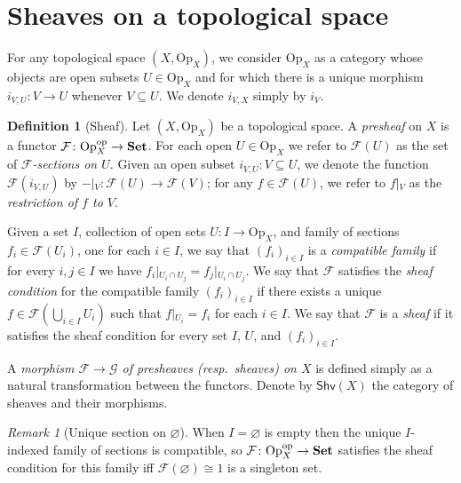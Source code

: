 \documentclass[11pt, oneside, article]{memoir}
\theoremstyle{plain}
\theoremstyle{definition}
\newtheorem{definition}[theorem]{Definition}
\theoremstyle{remark}
\newtheorem{remark}[theorem]{Remark}
\renewcommand{\ss}{\subseteq}
\newcommand{\Set}[1]{\mathrm{#1}}
\newcommand{\cat}[1]{\mathcal{#1}}
\newcommand{\Cat}[1]{\mathbf{#1}}
\newcommand{\fun}[1]{\mathcal{#1}}
\newcommand{\Fun}[1]{\mathsf{#1}}
\newcommand{\sheaf}[1]{\fun{#1}}
\newcommand{\smset}{\Cat{Set}}
\newcommand{\tn}[1]{\textnormal{#1}}
\newcommand{\shv}{\Fun{Shv}}
\newcommand{\Op}{\Set{Op}}
\newcommand{\op}{^\tn{op}}
\newcommand{\rest}[2]{#1\big|\hspace{0in}_{#2}}
\begin{document}
\section{Sheaves on a topological space}

For any topological space $(X,\Op_X)$, we consider $\Op_X$ as a category whose objects are open subsets $U\in\Op_X$ and for which there is a unique morphism $i_{V,U}\colon V\to U$ whenever $V\ss U$. We denote $i_{V,X}$ simply by $i_V$.

\begin{definition}[Sheaf]\label{def.sheaf}
Let $(X,\Op_X)$ be a topological space. A \emph{presheaf} on $X$ is a functor $\sheaf{F}\colon\Op_X\op\to\smset$. For each open $U\in\Op_X$ we refer to $\sheaf{F}(U)$ as the set of \emph{$\sheaf{F}$-sections on $U$}. Given an open subset $i_{V,U}\colon V\ss U$, we denote the function $\sheaf{F}(i_{V,U})$ by $\rest{-}{V}\colon\sheaf{F}(U)\to\sheaf{F}(V)$; for any $f\in\sheaf{F}(U)$, we refer to $\rest{f}{V}$ as the \emph{restriction of $f$ to $V$}.

Given a set $I$, collection of open sets $U\colon I\to\Op_X$, and family of sections $f_i\in\sheaf{F}(U_i)$, one for each $i\in I$, we say that $(f_i)_{i\in I}$ is a \emph{compatible family} if for every $i,j\in I$ we have $\rest{f_i}{U_i\cap U_j}=\rest{f_j}{U_i\cap U_j}$. We say that $\sheaf{F}$ satisfies the \emph{sheaf condition} for the compatible family $(f_i)_{i\in I}$ if there exists a unique $f\in \sheaf{F}(\bigcup_{i\in I}U_i)$ such that $\rest{f}{U_i}=f_i$ for each $i\in I$. We say that $\sheaf{F}$ is a \emph{sheaf} if it satisfies the sheaf condition for every set $I$, $U$, and $(f_i)_{i\in I}$.

A \emph{morphism $\sheaf{F}\to\sheaf{G}$ of presheaves (resp.\ sheaves) on $X$} is defined simply as a natural transformation between the functors. Denote by $\shv(X)$ the category of sheaves and their morphisms.
\end{definition}

\begin{remark}[Unique section on $\varnothing$]\label{rem.unique_sec_empty}
When $I=\varnothing$ is empty then the unique $I$-indexed family of sections is compatible, so $\cat{F}\colon\Op_X\op\to\smset$ satisfies the sheaf condition for this family iff $\sheaf{F}(\varnothing)\cong 1$ is a singleton set.
\end{remark}
\end{document}
